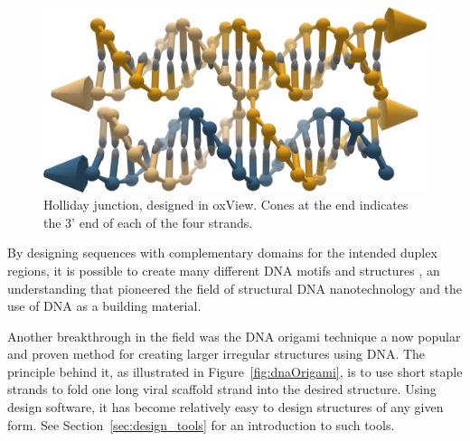 \begin{figure}
    \centering\includegraphics[width=\textwidth]{figures/holliday.png}
    \caption{Holliday junction, designed in oxView. Cones at the end indicates the 3' end of each of the four strands.}
    \label{fig:holliday}
\end{figure}



By designing sequences with complementary domains for the intended duplex regions, it is possible to create many different DNA motifs and structures \cite{seeman_2016, Seeman1982}, an understanding that pioneered the field of structural DNA nanotechnology and the use of DNA as a building material.


Another breakthrough in the field was the DNA origami technique \cite{rothemund2006folding} a now popular and proven method for creating larger irregular structures using DNA. The principle behind it, as illustrated in Figure~\ref{fig:dnaOrigami}, is to use short staple strands to fold one long viral scaffold strand into the desired structure. Using design software, it has become relatively easy to design structures of any given form. See Section~\ref{sec:design_tools} for an introduction to such tools.

